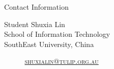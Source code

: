 \documentclass[
 size=14pt,
 paper=smartboard,  %
 mode=present, 		%
 display=slides, 	%
 style=tuliplab,  	%
 pauseslide,
 fleqn,leqno]{powerdot}
\begin{document}


\begin{wideslide}[toc=,bm=]{Contact Information}
\centering
{}
\twocolumn[
lcolwidth=0.35\linewidth,
rcolwidth=0.65\linewidth
]
{
}
{
Student Shuxia Lin\\
School of Information Technology\\
SouthEast University, China
\begin{description}
 \item[\textcolor{orange}{\faEnvelope}] \href{mailto:shuxialin@tulip.org.au}
 {\textsc{\footnotesize{shuxialin@tulip.org.au}}}

\end{description}
}
\end{wideslide}
\end{document}
